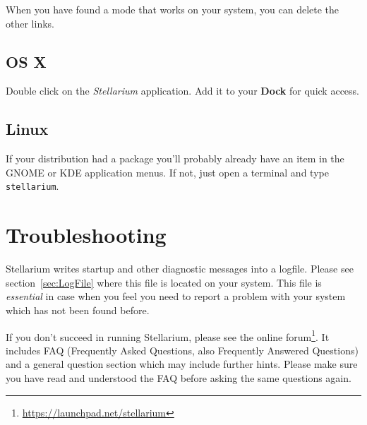 When you have found a mode that works on your system, you can delete
the other links.

\subsection{OS X}
\label{sec:GettingStarted:Running:MacOSX}

Double click on the \emph{Stellarium} application.  Add it to your
\textbf{Dock} for quick access.

\subsection{Linux}
\label{sec:GettingStarted:Running:Linux}

If your distribution had a package you'll probably already have an
item in the GNOME or KDE application menus. If not, just open a
terminal and type \texttt{stellarium}.


\section{Troubleshooting}
\label{sec:GettingStarted:Running:Troubleshooting}

Stellarium writes startup and other diagnostic messages into a
logfile. Please see section~\ref{sec:LogFile} where this
file is located on your system. This file is \emph{essential} in case when
you feel you need to report a problem with your system which has not
been found before.

If you don't succeed in running Stellarium, please see the online
forum\footnote{\url{https://launchpad.net/stellarium}}.  It includes
FAQ (Frequently Asked Questions, also Frequently Answered
Questions) and a general question section which may include
further hints. Please make sure you have read and understood the FAQ
before asking the same questions again.


